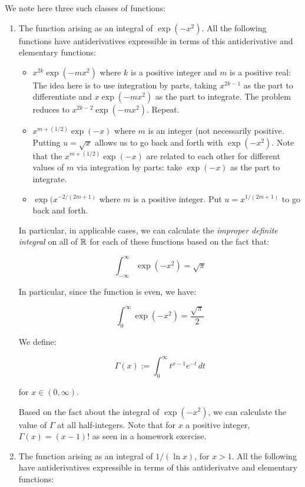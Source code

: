 \documentclass[10pt]{amsart}
\begin{document}
We note here three such classes of functions:

\begin{enumerate}
\item The function arising as an integral of $\exp(-x^2)$. All the
  following functions have antiderivatives expressible in terms of
  this antiderivative and elementary functions: 

  \begin{itemize}
  \item $x^{2k}\exp(-mx^2)$ where $k$ is a positive integer and $m$ is
    a positive real: The idea here is to use integration by parts,
    taking $x^{2k - 1}$ as the part to differentiate and
    $x\exp(-mx^2)$ as the part to integrate. The problem reduces to
    $x^{2k - 2}\exp(-mx^2)$. Repeat.
  \item $x^{m + (1/2)}\exp(-x)$ where $m$ is an integer (not
    necessarily positive. Putting $u = \sqrt{x}$ allows us to go back
    and forth with $\exp(-x^2)$. Note that the $x^{m + (1/2)}\exp(-x)$
    are related to each other for different values of $m$ via
    integration by parts: take $\exp(-x)$ as the part to integrate.
  \item $\exp(x^{-2/(2m + 1)}$ where $m$ is a positive integer. Put $u
    = x^{1/(2m + 1)}$ to go back and forth.
  \end{itemize}

  In particular, in applicable cases, we can calculate the {\em
  improper definite integral} on all of $\mathbb{R}$ for each of these
  functions based on the fact that:

  $$\int_{-\infty}^\infty \exp(-x^2) = \sqrt{\pi}$$

  In particular, since the function is even, we have:

  $$\int_0^\infty \exp(-x^2) = \frac{\sqrt{\pi}}{2}$$

  We define:

  $$\Gamma(x) := \int_0^\infty t^{x - 1}e^{-t} \, dt$$

  for $x \in (0,\infty)$.

  Based on the fact about the integral of $\exp(-x^2)$, we can
  calculate the value of $\Gamma$ at all half-integers. Note that for
  $x$ a positive integer, $\Gamma(x) = (x - 1)!$ as seen in a homework
  exercise.

\item The function arising as an integral of $1/(\ln x)$, for $x >
  1$. All the following have antiderivatives expressible in terms of
  this antiderivatve and elementary functions:


\end{enumerate}
\end{document}
